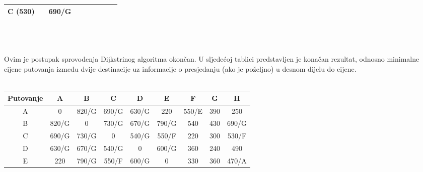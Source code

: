 \documentclass[12pt]{article}
\begin{document}
\begin{enumerate}
\begin{tabular}{|c|c|c|c|c|c|c|c|c|}
C (530)      & {\color[HTML]{FE0000} }      & {\color[HTML]{FE0000} 690/G} &                              &                              &                              & {\color[HTML]{FE0000} }      &                              &                          \\ \hline
\end{tabular}
\\
\\
\\
Ovim je postupak sprovođenja Dijkstrinog algoritma okončan. U sljedećoj tablici predstavljen je
konačan rezultat, odnosno minimalne cijene putovanja između dvije destinacije uz informacije o
presjedanju (ako je poželjno) u desnom dijelu do cijene.
\\
\\
\begin{tabular}{|c|c|c|c|c|c|c|c|c|}
\hline
Putovanje & A                            & B                            & C                            & D                            & E                            & F                            & G                          & H                            \\ \hline
A    & {\color[HTML]{333333} 0}     & {\color[HTML]{333333} 820/G} & {\color[HTML]{333333} 690/G} & {\color[HTML]{333333} 630/G} & {\color[HTML]{333333} 220}   & {\color[HTML]{333333} 550/E} & {\color[HTML]{333333} 390} & {\color[HTML]{333333} 250}   \\ \hline
B    & {\color[HTML]{333333} 820/G} & {\color[HTML]{333333} 0}     & {\color[HTML]{333333} 730/G} & {\color[HTML]{333333} 670/G} & {\color[HTML]{333333} 790/G} & {\color[HTML]{333333} 540}   & {\color[HTML]{333333} 430} & {\color[HTML]{333333} 690/G} \\ \hline
C    & {\color[HTML]{333333} 690/G} & {\color[HTML]{333333} 730/G} & {\color[HTML]{333333} 0}     & {\color[HTML]{333333} 540/G} & {\color[HTML]{333333} 550/F} & {\color[HTML]{333333} 220}   & {\color[HTML]{333333} 300} & {\color[HTML]{333333} 530/F} \\ \hline
D    & {\color[HTML]{333333} 630/G} & {\color[HTML]{333333} 670/G} & {\color[HTML]{333333} 540/G} & {\color[HTML]{333333} 0}     & {\color[HTML]{333333} 600/G} & {\color[HTML]{333333} 360}   & {\color[HTML]{333333} 240} & {\color[HTML]{333333} 490}   \\ \hline
E    & {\color[HTML]{333333} 220}   & {\color[HTML]{333333} 790/G} & {\color[HTML]{333333} 550/F} & {\color[HTML]{333333} 600/G} & {\color[HTML]{333333} 0}     & {\color[HTML]{333333} 330}   & {\color[HTML]{333333} 360} & {\color[HTML]{333333} 470/A} \\ \hline

\end{tabular}
\end{enumerate}
\end{document}
